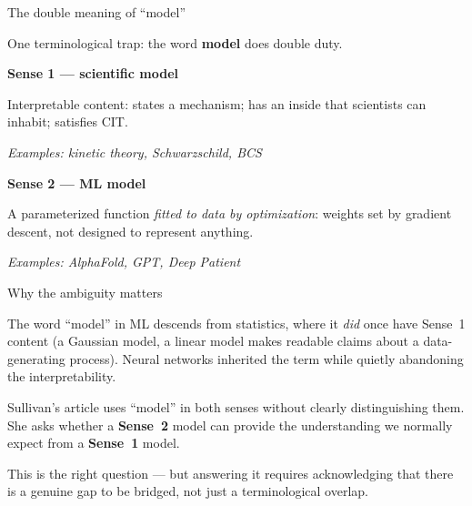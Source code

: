 \documentclass[fleql]{beamer}
\newcommand{\kw}[1]{\textbf{#1}}
\begin{document}
\begin{frame}{The double meaning of ``model''}

  One terminological trap: the word \kw{model} does double duty.

  \vspace{0.6em}
  \textbf{Sense 1 --- scientific model}\par\smallskip
  Interpretable content: states a mechanism; has an inside that
  scientists can inhabit; satisfies CIT.
  \par{\small\emph{Examples: kinetic theory, Schwarzschild, BCS}}

  \vspace{0.6em}
  \textbf{Sense 2 --- ML model}\par\smallskip
  A parameterized function \emph{fitted to data by optimization}:
  weights set by gradient descent, not designed to represent anything.
  \par{\small\emph{Examples: AlphaFold, GPT, Deep Patient}}

\end{frame}

\begin{frame}{Why the ambiguity matters}

  The word ``model'' in ML descends from statistics, where it
  \emph{did} once have Sense~1 content (a Gaussian model, a linear
  model makes readable claims about a data-generating process).
  Neural networks inherited the term while quietly abandoning
  the interpretability.

  \vspace{0.8em}
  Sullivan's article uses ``model'' in both senses without clearly
  distinguishing them. She asks whether a \textbf{Sense~2} model
  can provide the understanding we normally expect from a
  \textbf{Sense~1} model.

  \vspace{0.5em}
  This is the right question --- but answering it requires
  acknowledging that there is a genuine gap to be bridged,
  not just a terminological overlap.

\end{frame}
\end{document}
